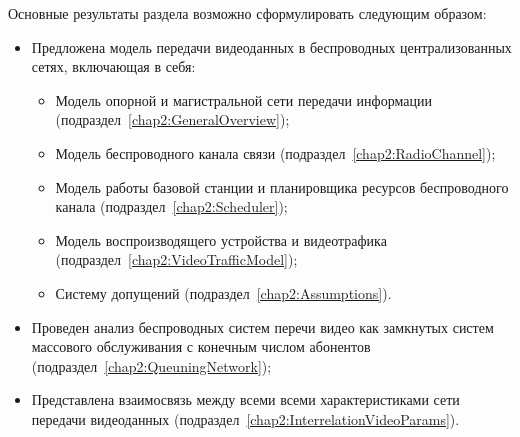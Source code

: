 Основные результаты раздела возможно сформулировать следующим образом:
\begin{itemize}
	\item Предложена модель передачи видеоданных в беспроводных централизованных сетях, включающая в себя:
	\begin{itemize}
		\item Модель опорной и магистральной сети передачи информации (подраздел~\ref{chap2:GeneralOverview});
		\item Модель беспроводного канала связи (подраздел~\ref{chap2:RadioChannel});
		\item Модель работы базовой станции и планировщика ресурсов беспроводного канала (подраздел~\ref{chap2:Scheduler});
		\item Модель воспроизводящего устройства и видеотрафика (подраздел~\ref{chap2:VideoTrafficModel});
		\item Систему допущений (подраздел~\ref{chap2:Assumptions}).
	\end{itemize}
	\item Проведен анализ беспроводных систем перечи видео как замкнутых систем массового обслуживания с конечным числом абонентов (подраздел~\ref{chap2:QueuningNetwork});
	\item Представлена взаимосвязь между всеми всеми характеристиками сети передачи видеоданных (подраздел~\ref{chap2:InterrelationVideoParams}).
\end{itemize}